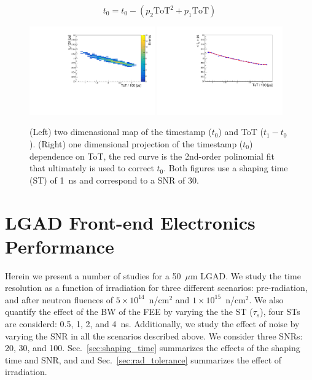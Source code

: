 \documentclass[preprint,1p]{elsarticle}
\begin{document}
\begin{equation}\label{eq:time_walk}
  t_{0} = t_{0}-(p_{2}\mathrm{ToT}^2+p_{1}\mathrm{ToT})
\end{equation}

\begin{figure}[htbp]
  \centering
  \includegraphics[width=0.48\textwidth]{figs/twoD_ToT_pre_rad_st_1ns_snr_30_le_tot_threshold_30mV_v2.pdf} \hfill
  \includegraphics[width=0.48\textwidth]{figs/oneD_ToT_pre_rad_st_1ns_snr_30_le_tot_threshold_30mV_v2.pdf}
  \caption{(Left) two dimenasional map of the timestamp ($t_{0}$) and ToT ($t_{1} - t_{0}$).
  (Right) one dimensional projection of the timestamp ($t_{0}$) dependence on ToT, the red curve is the 2nd-order polinomial fit that
  ultimately is used to correct $t_{0}$. Both figures use a shaping time (ST) of 1~\si{ns} and correspond to a SNR of 30.}
  \label{fig:ToT}
\end{figure}




\section{LGAD Front-end Electronics Performance}\label{sec:results}

Herein we present a number of studies for a 50~$\mu$m LGAD. We study the time resolution as a function of irradiation
for three different scenarios: pre-radiation, and after neutron fluences of
 $5\times 10^{14}$~n/cm$^2$ and $1\times 10^{15}$~n/cm$^2$. We also quantify the effect of the BW of the FEE by varying the
 the ST ($\tau_{s}$), four STs are considerd: 0.5, 1, 2, and 4~\si{ns}. Additionally, we study the effect of noise by varying
 the SNR in all the scenarios described above. We consider three SNRs: 20, 30, and 100.
 Sec.~\ref{sec:shaping_time} summarizes the effects of the shaping time and SNR, and
and Sec.~\ref{sec:rad_tolerance} summarizes the effect of irradiation.
\end{document}
